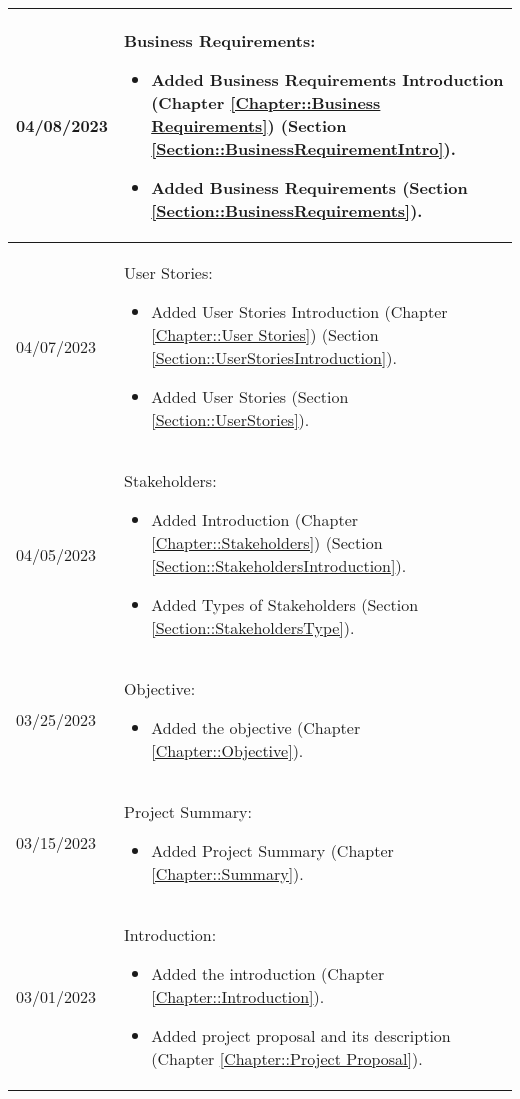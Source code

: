 \begin{longtable}{|l||p{13.5cm}|}
04/08/2023 & Business Requirements:
\begin{itemize}[topsep=0pt,itemsep=0pt,parsep=0pt,partopsep=0pt,leftmargin=12pt]
\item Added Business Requirements Introduction (Chapter \ref{Chapter::Business Requirements}) (Section \ref{Section::BusinessRequirementIntro}). 
\item Added Business Requirements (Section \ref{Section::BusinessRequirements}). 
\end{itemize} 
\\ \hline

04/07/2023 & User Stories:
\begin{itemize}[topsep=0pt,itemsep=0pt,parsep=0pt,partopsep=0pt,leftmargin=12pt]
\item Added User Stories Introduction (Chapter \ref{Chapter::User Stories}) (Section \ref{Section::UserStoriesIntroduction}). 
\item Added User Stories (Section \ref{Section::UserStories}).
\end{itemize} 
\\ \hline

04/05/2023 & Stakeholders:
\begin{itemize}[topsep=0pt,itemsep=0pt,parsep=0pt,partopsep=0pt,leftmargin=12pt]
\item Added Introduction (Chapter \ref{Chapter::Stakeholders}) (Section \ref{Section::StakeholdersIntroduction}). 
\item Added Types of Stakeholders (Section \ref{Section::StakeholdersType}).
\end{itemize} 
\\ \hline

03/25/2023 & Objective:
\begin{itemize}[topsep=0pt,itemsep=0pt,parsep=0pt,partopsep=0pt,leftmargin=12pt]
\item Added the objective (Chapter \ref{Chapter::Objective}). 
\end{itemize} 
\\ \hline

03/15/2023 & Project Summary:
\begin{itemize}[topsep=0pt,itemsep=0pt,parsep=0pt,partopsep=0pt,leftmargin=12pt]
\item Added Project Summary (Chapter \ref{Chapter::Summary}). 
\end{itemize} 
\\ \hline

03/01/2023 & Introduction:
\begin{itemize}[topsep=0pt,itemsep=0pt,parsep=0pt,partopsep=0pt,leftmargin=12pt]
\item Added the introduction (Chapter \ref{Chapter::Introduction}). 
\item Added project proposal and its description (Chapter \ref{Chapter::Project Proposal}).
\end{itemize} 
\\ \hline

\end{longtable}


